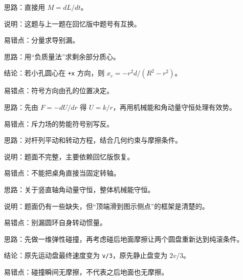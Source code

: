 \documentclass[12pt,a4paper]{ctexart}
\begin{document}
\begin{tcolorbox}[colback=white,colframe=black!55,title={一-11. 已知质点角动量 \(L=6t^2 i-(2t+1)j\)，求 \(t=1 s\) 时所受力矩}]
思路：直接用 \(M=dL/dt\)。\par
说明：这题与上一题在回忆版中题号有互换。\par
易错点：分量求导别漏。\par
\end{tcolorbox}

\begin{tcolorbox}[colback=white,colframe=black!55,title={一-12. 半径 \texttt{R} 的均质圆盘挖去半径 \texttt{r} 的偏心小圆盘}]
思路：用“负质量法”求剩余部分质心。\par
结论：若小孔圆心在 \texttt{+x} 方向，则 \(x_c=-r^2d/(R^2-r^2)\)。\par
易错点：符号方向由孔的位置决定。\par
\end{tcolorbox}

\begin{tcolorbox}[colback=white,colframe=black!55,title={二-1. 斥力有心场 \(F(r)=k/r^2\)，求势能与最近距离}]
思路：先由 \(F=-dU/dr\) 得 \(U=k/r\)，再用机械能和角动量守恒处理有效势。\par
易错点：斥力场的势能符号别写反。\par
\end{tcolorbox}

\begin{tcolorbox}[colback=white,colframe=black!55,title={二-2. 细杆从桌边滑落，在持续接触阶段求支持力与转角关系}]
思路：对杆列平动和转动方程，结合几何约束与摩擦条件。\par
说明：题面不完整，主要依赖回忆版恢复。\par
易错点：不能把桌角直接当固定转轴。\par
\end{tcolorbox}

\begin{tcolorbox}[colback=white,colframe=black!55,title={二-3. 带槽圆环可绕竖直直径转动，小球从槽顶端滑下}]
思路：关于竖直轴角动量守恒，整体机械能守恒。\par
说明：题面仍有一些缺失，但“顶端滑到图示侧点”的框架是清楚的。\par
易错点：别漏圆环自身转动惯量。\par
\end{tcolorbox}

\begin{tcolorbox}[colback=white,colframe=black!55,title={二-4. 两个相同圆盘碰撞后重新恢复纯滚}]
思路：先做一维弹性碰撞，再考虑碰后地面摩擦让两个圆盘重新达到纯滚条件。\par
结论：原先运动盘最终速度变为 \texttt{v/3}，原先静止盘变为 \(2v/3\)。\par
易错点：碰撞瞬间无摩擦，不代表之后地面也无摩擦。\par
\end{tcolorbox}
\end{document}
